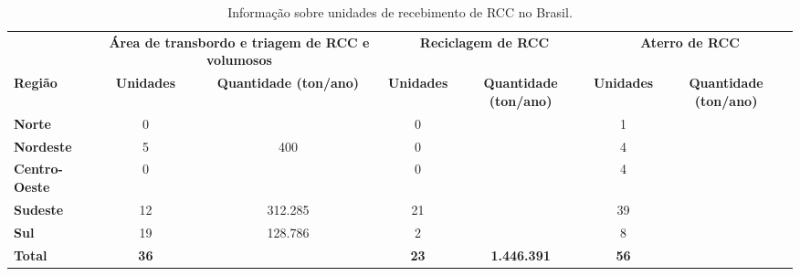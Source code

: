 \begin{table}[htbp]
  \centering
  \caption{ Informação sobre unidades de recebimento de RCC no Brasil.}
    \begin{tabular}{p{6.215em}|c|c|c|c|c|c}
    \rowcolor[rgb]{ .969,  .588,  .275} \multicolumn{1}{c|}{\textcolor[rgb]{ 1,  1,  1}{}} & \multicolumn{2}{p{10em}|}{\textcolor[rgb]{ 1,  1,  1}{\textbf{Área de transbordo e triagem de RCC e volumosos}}} & \multicolumn{2}{p{9.5em}|}{\textcolor[rgb]{ 1,  1,  1}{\textbf{Reciclagem de RCC}}} & \multicolumn{2}{p{9.86em}}{\textcolor[rgb]{ 1,  1,  1}{\textbf{Aterro de RCC}}} \\
    \rowcolor[rgb]{ .969,  .588,  .275} \textcolor[rgb]{ 1,  1,  1}{\textbf{Região}} & \multicolumn{1}{p{4.215em}|}{\textcolor[rgb]{ 1,  1,  1}{\textbf{Unidades}}} & \multicolumn{1}{p{5.785em}|}{\textcolor[rgb]{ 1,  1,  1}{\textbf{Quantidade (ton/ano)}}} & \multicolumn{1}{p{4.215em}|}{\textcolor[rgb]{ 1,  1,  1}{\textbf{Unidades}}} & \multicolumn{1}{p{5.285em}|}{\textcolor[rgb]{ 1,  1,  1}{\textbf{Quantidade (ton/ano)}}} & \multicolumn{1}{p{4.215em}|}{\textcolor[rgb]{ 1,  1,  1}{\textbf{Unidades}}} & \multicolumn{1}{p{5.645em}}{\textcolor[rgb]{ 1,  1,  1}{\textbf{Quantidade (ton/ano)}}} \\
    \rowcolor[rgb]{ .984,  .831,  .706} \textbf{Norte} & 0     &       & 0     &       & 1     &  \\
    \rowcolor[rgb]{ .992,  .914,  .851} \textbf{Nordeste} & 5     & 400   & 0     &       & 4     &  \\
    \rowcolor[rgb]{ .984,  .831,  .706} \textbf{Centro-Oeste} & 0     &       & 0     &       & 4     &  \\
    \rowcolor[rgb]{ .992,  .914,  .851} \textbf{Sudeste} & 12    & 312.285 & 21    &       & 39    &  \\
    \rowcolor[rgb]{ .984,  .831,  .706} \textbf{Sul} & 19    & 128.786 & 2     &       & 8     &  \\
    \rowcolor[rgb]{ .992,  .914,  .851} \textbf{Total} & \textbf{36} &       & \textbf{23} & \textbf{1.446.391} & \textbf{56} &  \\
    \end{tabular}%
  \label{tab:unidade_rcc}%
\end{table}%
